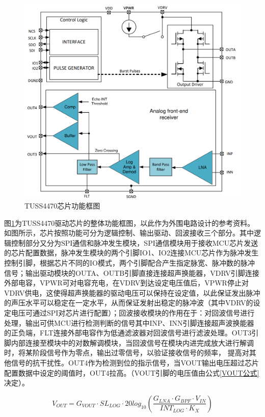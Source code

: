     
    \begin{figure}[ht]
		\centering
		\includegraphics[width=12cm]{figure/Function Block Diagram.png}
		\caption{TUSS4470芯片功能框图}
		\label{TUSS4470芯片功能框图}%
\end{figure}
 图\ref{TUSS4470芯片功能框图}为TUSS4470驱动芯片的整体功能框图，以此作为外围电路设计的参考资料。如图所示，芯片按照功能可分为逻辑控制、输出驱动、回波接收三个部分。其中逻辑控制部分又分为SPI通信和脉冲发生模块，SPI通信模块用于接收MCU芯片发送的芯片配置数据，脉冲发生模块的两个引脚IO1、IO2连接MCU芯片作为脉冲发生控制引脚，根据芯片不同的IO模式，两个引脚配合产生指定脉宽、脉冲数的脉冲信号；输出驱动模块的OUTA、OUTB引脚直接连接超声换能器，VDRV引脚连接外部电容，VPWR可对电容充电，在VDRV到达设定电压值后，VPWR停止对VDRV供电，这使得超声换能器的驱动电压可以保持在设定值，以此保证发出脉冲的声压水平可以稳定在一定水平，从而保证发射出稳定的脉冲波（其中VDRV的设定电压可通过SPI对芯片进行配置）；回波接收模块的作用在于：对回波信号进行处理，输出可供MCU进行检测判断的信号其中INP、INN引脚连接超声波换能器的正负端，FLT连接外部电容作为低通滤波器对回波信号进行滤波处理。OUT3引脚内部连接至模块中的对数解调模块，当回波信号在模块内进完成放大进行解调时，将某阶段信号作为零点，输出过零信号，以验证接收信号的频率， 提高对其他信号的抗干扰性。OUT4作为检测到位的指示信号，当VOUT输出电压超过芯片配置数据中设定的阈值时，OUT4拉高。（VOUT引脚的电压值由公式\ref{VOUT公式}决定）。
  
    \begin{equation}
        V_{OUT}=G_{VOUT} \cdot SL_{LOG}\cdot20log_{10}(\frac{G_{LNA} \cdot G_{BPF} \cdot V_{IN}}{INT_{LOG} \cdot K_X})
        \label{VOUT公式}
    \end{equation}

